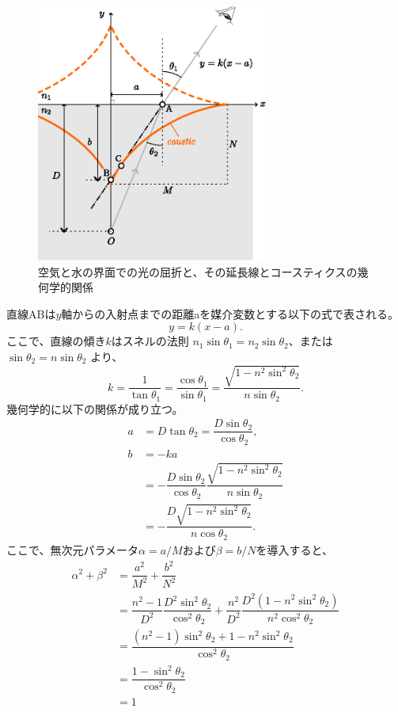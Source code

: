\documentclass[twocolumn]{article}
\begin{document}
\begin{figure}
	\centering
	\includegraphics[width=3in]{figs/g237.eps}
	\caption{空気と水の界面での光の屈折と、その延長線とコースティクスの幾何学的関係}
	\label{fig:geometry}
\end{figure}
	
直線ABは$y$軸からの入射点までの距離aを媒介変数とする以下の式で表される。
$$y=k(x-a).$$
ここで、直線の傾き$k$はスネルの法則
$ {n_1} \sin\theta_1 = {n_2} \sin\theta_2$、または$\sin\theta_2 = n\sin\theta_2$
より、
$$k=\dfrac{1}{\tan\theta_1}=\dfrac{\cos\theta_1}{\sin\theta_1}
=\dfrac{\sqrt{1-n^2\sin^2\theta_2}}{n\sin\theta_2}.$$
幾何学的に以下の関係が成り立つ。
$$\begin{aligned}
	a &= D\tan\theta_2 = \dfrac{D\sin\theta_2}{\cos\theta_2},\\
	b &= -ka \\
	&= -\dfrac{D\sin\theta_2}{\cos\theta_2}
	\dfrac{\sqrt{1-n^2\sin^2\theta_2}}{n\sin\theta_2}\\
	&=-\dfrac{D\sqrt{1-n^2\sin^2\theta_2}}{n\cos\theta_2}.
\end{aligned}$$
ここで、無次元パラメータ$\alpha=a/M$および$\beta=b/N$を導入すると、
$$ \begin{aligned}
	\alpha^2 + \beta^2 &= \dfrac{a^2}{M^2}+\dfrac{b^2}{N^2}\\
	&=\dfrac{n^2-1}{D^2}\dfrac{D^2\sin^2\theta_2}{\cos^2\theta_2}%
	+\dfrac{n^2}{D^2}\dfrac{D^2(1-n^2\sin^2\theta_2)}{n^2\cos^2\theta_2}\\
	&=\dfrac{\left(n^2-1\right)\sin^2\theta_2 + 1-n^2\sin^2\theta_2}
	{\cos^2\theta_2}\\
	&=\dfrac{1-\sin^2\theta_2}{\cos^2\theta_2}\\
	&= 1
\end{aligned}$$
	
\end{document}
